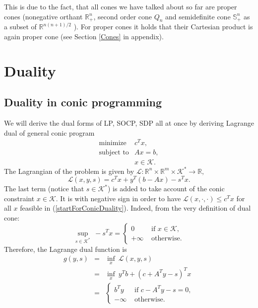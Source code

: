 \documentclass[10pt,oneside]{book}
\theoremstyle{definition}
\begin{document}
This is due to the fact, that all cones we have talked about so far are proper cones (nonegative orthant $\mathbb{R}^n_+$, second order cone $Q_n$ and semidefinite cone $\mathbb{S}^n_+$ as a subset of $ \mathbb{R}^{n(n+1)/2}$ ). 
For proper cones it holds that their Cartesian product is again proper cone (see Section \ref{Cones} in appendix).  

\section{Duality}


\subsection{Duality in conic programming}

We will derive the dual forms of LP, SOCP, SDP all at once by deriving Lagrange dual of general conic program
\begin{equation}
\label{startForConicDuality}
\begin{array}{ll}
\mbox{minimize} & c^Tx,\\
\mbox{subject to}& Ax = b,\\
& x \in \mathcal{K}.
\end{array} 
\end{equation}
The Lagrangian of the problem is given by $\mathcal{L}:\mathbb{R}^n\times\mathbb{R}^m\times\mathcal{K}^*\rightarrow \mathbb{R},$
\begin{equation}
\mathcal{L}(x,y,s) = c^Tx + y^T(b-Ax) - s^Tx. %
\end{equation}
The last term (notice that $s\in\mathcal{K}^*$) is added to take account of the conic constraint $x\in \mathcal{K}$.  
It is with negative sign in order to have $\mathcal{L}(x,\cdot,\cdot)\leq c^Tx$ for all $x$ feasible in (\ref{startForConicDuality}). 
Indeed, from the very definition of dual cone:
\begin{equation}
\sup_{s\in \mathcal{K}^*} \ -s^Tx = 
\left\lbrace \begin{array}{ll} 
0 & \mbox{ if } x\in\mathcal{K},\\ 
+\infty & \mbox{ otherwise.}
\end{array}\right. 
\end{equation}
Therefore, the Lagrange dual function is 
\begin{eqnarray}
g(y,s) &=& \inf_x \ \mathcal{L}(x,y,s) \\
&=& \inf_x \ y^Tb + (c+A^Ty -s)^Tx \\
&=& \left\lbrace \begin{array}{ll} 
b^Ty & \mbox{ if } c-A^Ty - s = 0,\\ 
-\infty & \mbox{ otherwise.}
\end{array}\right. 
\end{eqnarray}
\end{document}
